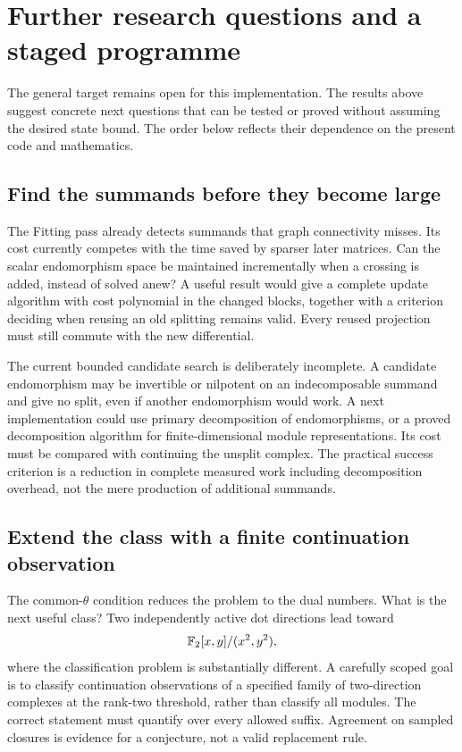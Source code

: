 \section{Further research questions and a staged programme}
\label{sec:agenda}

The general target remains open for this implementation. The results above
suggest concrete next questions that can be tested or proved without
assuming the desired state bound. The order below reflects their dependence
on the present code and mathematics.

\subsection{Find the summands before they become large}
The Fitting pass already detects summands that graph connectivity misses.
Its cost currently competes with the time saved by sparser later matrices.
Can the scalar endomorphism space be maintained incrementally when a crossing
is added, instead of solved anew? A useful result would give a complete update
algorithm with cost polynomial in the changed blocks, together with a
criterion deciding when reusing an old splitting remains valid. Every reused
projection must still commute with the new differential.

The current bounded candidate search is deliberately incomplete. A candidate
endomorphism may be invertible or nilpotent on an indecomposable summand and
give no split, even if another endomorphism would work. A next implementation
could use primary decomposition of endomorphisms, or a proved decomposition
algorithm for finite-dimensional module representations. Its cost must be
compared with continuing the unsplit complex. The practical success criterion
is a reduction in complete measured work including decomposition overhead,
not the mere production of additional summands.

\subsection{Extend the class with a finite continuation observation}
The common-$\theta$ condition reduces the problem to the dual numbers. What
is the next useful class? Two independently active dot directions lead toward
\[
 \mathbb F_2[x,y]/(x^2,y^2),
\]
where the classification problem is substantially different. A carefully
scoped goal is to classify continuation observations of a specified family of
two-direction complexes at the rank-two threshold, rather than classify all
modules. The correct statement must quantify over every allowed suffix.
Agreement on sampled closures is evidence for a conjecture, not a valid
replacement rule.


